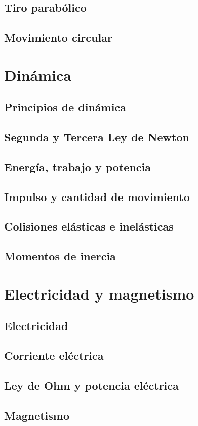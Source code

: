 \documentclass{../summarie}
\begin{document}
    \chapter{Tiro parabólico}
    \chapter{Movimiento circular}

\part{Dinámica}

    \chapter{Principios de dinámica}
    \chapter{Segunda y Tercera Ley de Newton}
    \chapter{Energía, trabajo y potencia}
    \chapter{Impulso y cantidad de movimiento}
    \chapter{Colisiones elásticas e inelásticas}
    \chapter{Momentos de inercia}

\part{Electricidad y magnetismo}

    \chapter{Electricidad}
    \chapter{Corriente eléctrica}
    \chapter{Ley de Ohm y potencia eléctrica}
    \chapter{Magnetismo}


\newpage


\end{document}
